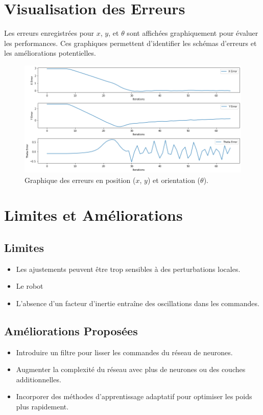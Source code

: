 \documentclass{article}
\begin{document}
\section{Visualisation des Erreurs}
Les erreurs enregistrées pour $x$, $y$, et $\theta$ sont affichées graphiquement pour évaluer les performances. Ces graphiques permettent d'identifier les schémas d'erreurs et les améliorations potentielles.

\begin{figure}[ht!]
    \centering
    \includegraphics[width=1\textwidth]{errors_plot.png} %
    \caption{Graphique des erreurs en position ($x$, $y$) et orientation ($\theta$).}
    \label{fig:errors}
\end{figure}

\newpage
\section{Limites et Améliorations}
\subsection*{Limites}
\begin{itemize}
    \item Les ajustements peuvent être trop sensibles à des perturbations locales.
    \item Le robot 
    \item L'absence d'un facteur d'inertie entraîne des oscillations dans les commandes.
\end{itemize}

\subsection*{Améliorations Proposées}
\begin{itemize}
    \item Introduire un filtre pour lisser les commandes du réseau de neurones.
    \item Augmenter la complexité du réseau avec plus de neurones ou des couches additionnelles.
    \item Incorporer des méthodes d'apprentissage adaptatif pour optimiser les poids plus rapidement.
\end{itemize}
\end{document}
